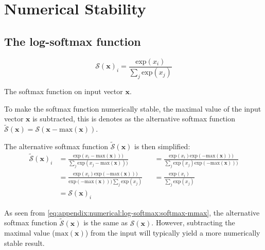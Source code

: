 \chapter{Numerical Stability}

\section{The log-softmax function}
\label{appendix:numerical-stability:log-softmax}

\begin{equationbox}[H]
\begin{equation*}
\mathcal{S}(\mathbf{x})_i = \frac{\mathrm{exp}(x_i)}{\sum_j \mathrm{exp}(x_j)}
\end{equation*}
\caption{The softmax function on input vector $\mathbf{x}$.}
\end{equationbox}

To make the softmax function numerically stable, the maximal value of the input vector $\mathbf{x}$ is subtracted, this is denotes as the alternative softmax function $\tilde{\mathcal{S}}(\mathbf{x}) = \mathcal{S}(\mathbf{x} - \mathrm{max}(\mathbf{x}))$.

The alternative softmax function $\tilde{\mathcal{S}}(\mathbf{x})$ is then simplified:
\begin{equation}
\begin{aligned}
\tilde{\mathcal{S}}(\mathbf{x})_i
&= \frac{\mathrm{exp}(x_i - \mathrm{max}(\mathbf{x})))}{\sum_j \mathrm{exp}(x_j - \mathrm{max}(\mathbf{x})))} &&= \frac{\mathrm{exp}(x_i)\mathrm{exp}(- \mathrm{max}(\mathbf{x})))}{\sum_j \mathrm{exp}(x_j)\mathrm{exp}(- \mathrm{max}(\mathbf{x})))} \\
&= \frac{\mathrm{exp}(x_i)\mathrm{exp}(- \mathrm{max}(\mathbf{x})))}{\mathrm{exp}(- \mathrm{max}(\mathbf{x}))) \sum_j \mathrm{exp}(x_j)} &&= \frac{\mathrm{exp}(x_i)}{\sum_j \mathrm{exp}(x_j)} \\
&= \mathcal{S}(\mathbf{x})_i
\end{aligned}
\label{eq:appendix:numerical:log-softmax:softmax-mmax}
\end{equation}

As seen from \eqref{eq:appendix:numerical:log-softmax:softmax-mmax}, the alternative softmax function $\tilde{\mathcal{S}}(\mathbf{x})$ is the same as $\mathcal{S}(\mathbf{x})$. However, subtracting the maximal value ($\mathrm{max}(\mathbf{x})$) from the input will typically yield a more numerically stable result. 

